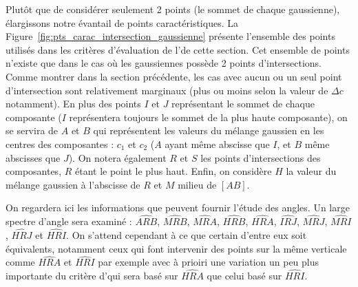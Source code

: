 \documentclass[main.tex]{subfiles}
\begin{document}
Plutôt que de considérer seulement 2 points (le sommet de chaque gaussienne), élargissons notre évantail de points caractéristiques. La Figure~\ref{fig:pts_carac_intersection_gaussienne} présente l'ensemble des points utilisés dans les critères d'évaluation de l'\hetero de cette section. Cet ensemble de points n'existe que dans le cas où les gaussiennes possède 2 points d'intersections. Comme montrer dans la section précédente, les cas avec aucun ou un seul point d'intersection sont relativement marginaux (plus ou moins selon la valeur de $\Delta c$ notamment). En plus des points $I$ et $J$ représentant le sommet de chaque composante ($I$ représentera toujours le sommet de la plus haute composante), on se servira de $A$ et $B$ qui représentent les valeurs du mélange gaussien en les centres des composantes : $c_1$ et $c_2$ ($A$ ayant même abscisse que $I$, et $B$ même abscisses que $J$). On notera également $R$ et $S$ les points d'intersections des composantes, $R$ étant le point le plus haut. Enfin, on considère $H$ la valeur du mélange gaussien à l'abscisse de $R$ et $M$ milieu de $[AB]$. 


On regardera ici les informations que peuvent fournir l'étude des angles. Un large spectre d'angle sera examiné : $\widehat{ARB}$, $\widehat{MRB}$, $\widehat{MRA}$,  $\widehat{HRB}$, $\widehat{HRA}$, $\widehat{IRJ}$, $\widehat{MRJ}$, $\widehat{MRI}$, $\widehat{HRJ}$ et $\widehat{HRI}$. 
On s'attend cependant à ce que certain d'entre eux soit équivalents, notamment ceux qui font intervenir des points sur la même verticale comme $\widehat{HRA}$ et $\widehat{HRI}$ par exemple avec à prioiri une variation un peu plus importante du critère d'\hetero qui sera basé sur $\widehat{HRA}$ que celui basé sur $\widehat{HRI}$.
\end{document}
